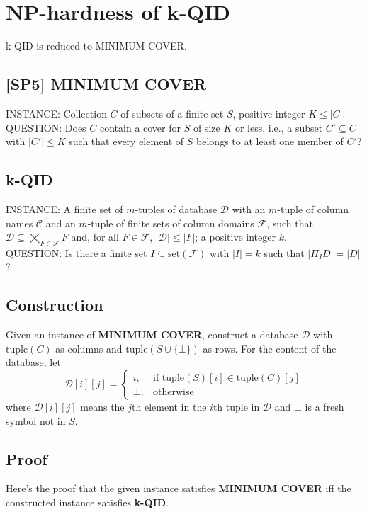 \documentclass[12pt]{article}
\begin{document}

\section*{NP-hardness of k-QID}
k-QID is reduced to MINIMUM COVER.

\subsection*{[SP5] MINIMUM COVER}
INSTANCE:   Collection $C$ of subsets of a finite set $S$, positive integer $K \leq |C|$.\\
QUESTION:   Does $C$ contain a cover for $S$ of size $K$ or less, i.e., a subset $C' \subseteq C$ with $|C'| \leq K$ such that every element of $S$ belongs to at least one member of $C'$?

\subsection*{k-QID}
INSTANCE: A finite set of $m$-tuples of database $\mathcal{D}$ with an $m$-tuple of column names $\mathcal{C}$ and an $m$-tuple of finite sets of column domains $\mathcal{F}$, such that $\mathcal{D} \subseteq \bigtimes_{F \in \mathcal{F}} F$ and, for all $F \in \mathcal{F}$, $|\mathcal{D}| \leq |F|$; a positive integer $k$.\\
QUESTION: Is there a finite set $I \subseteq \mathrm{set}(\mathcal{F})$ with $|I| = k$ such that $|\Pi_{I} D| = |D|$?

\subsection*{Construction}
Given an instance of \textbf{MINIMUM COVER}, construct a database $\mathcal{D}$ with $\mathrm{tuple}(C)$ as columns and $\mathrm{tuple}(S\cup\{\bot\})$ as rows. For the content of the database, let
$$
\mathcal{D}[i][j] =
\begin{cases}
    i,    &\text{if } \mathrm{tuple}(S)[i] \in \mathrm{tuple}(C)[j]\\
    \bot, &\text{otherwise}
\end{cases}
$$
where $\mathcal{D}[i][j]$ means the $j$th element in the $i$th tuple in $\mathcal{D}$ and $\bot$ is a fresh symbol not in $S$.

\subsection*{Proof}
Here's the proof that the given instance satisfies \textbf{MINIMUM COVER} iff the constructed instance satisfies \textbf{k-QID}.
\end{document}
